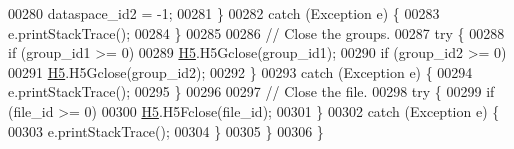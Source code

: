 \begin{DoxyCode}
00280             dataspace\_id2 = -1;
00281         \}
00282         \textcolor{keywordflow}{catch} (Exception e) \{
00283             e.printStackTrace();
00284         \}
00285 
00286         \textcolor{comment}{// Close the groups.}
00287         \textcolor{keywordflow}{try} \{
00288             \textcolor{keywordflow}{if} (group\_id1 >= 0)
00289                 \hyperlink{namespace_h5}{H5}.H5Gclose(group\_id1);
00290             \textcolor{keywordflow}{if} (group\_id2 >= 0)
00291                 \hyperlink{namespace_h5}{H5}.H5Gclose(group\_id2);
00292         \}
00293         \textcolor{keywordflow}{catch} (Exception e) \{
00294             e.printStackTrace();
00295         \}
00296 
00297         \textcolor{comment}{// Close the file.}
00298         \textcolor{keywordflow}{try} \{
00299             \textcolor{keywordflow}{if} (file\_id >= 0)
00300                 \hyperlink{namespace_h5}{H5}.H5Fclose(file\_id);
00301         \}
00302         \textcolor{keywordflow}{catch} (Exception e) \{
00303             e.printStackTrace();
00304         \}
00305     \}
00306 \}
\end{DoxyCode}
